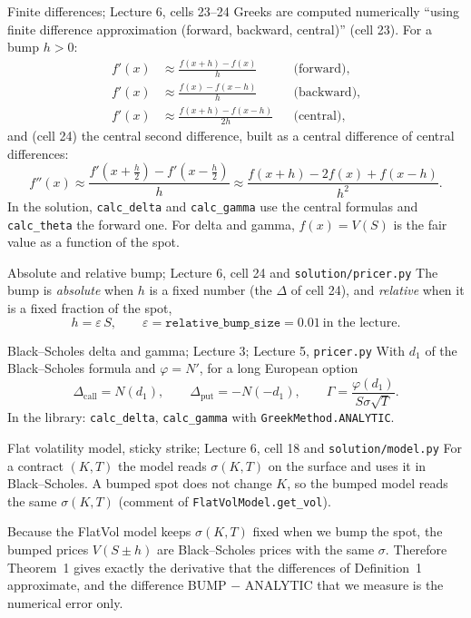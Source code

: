 \documentclass[11pt,a4paper]{article}
\begin{document}
\begin{defbox}{Finite differences; Lecture 6, cells 23--24}
Greeks are computed numerically ``using finite difference approximation (forward, backward, central)'' (cell 23). For a bump $h>0$:
\begin{equation}\label{eq:fd1}
\begin{aligned}
f'(x)&\approx\frac{f(x+h)-f(x)}{h} && \text{(forward)},\\
f'(x)&\approx\frac{f(x)-f(x-h)}{h} && \text{(backward)},\\
f'(x)&\approx\frac{f(x+h)-f(x-h)}{2h} && \text{(central)},
\end{aligned}
\end{equation}
and (cell 24) the central second difference, built as a central difference of central differences:
\begin{equation}\label{eq:fd2}
f''(x)\approx\frac{f'(x+\frac h2)-f'(x-\frac h2)}{h}\approx\frac{f(x+h)-2f(x)+f(x-h)}{h^2}.
\end{equation}
In the solution, \texttt{calc\_delta} and \texttt{calc\_gamma} use the central formulas and \texttt{calc\_theta} the forward one. For delta and gamma, $f(x)=V(S)$ is the fair value as a function of the spot.
\end{defbox}

\begin{defbox}{Absolute and relative bump; Lecture 6, cell 24 and \texttt{solution/pricer.py}}
The bump is \emph{absolute} when $h$ is a fixed number (the $\Delta$ of cell 24), and \emph{relative} when it is a fixed fraction of the spot,
\[
h=\varepsilon\,S,\qquad \varepsilon=\texttt{relative\_bump\_size}=0.01\ \text{in the lecture}.
\]
\end{defbox}

\begin{thmbox}{Black--Scholes delta and gamma; Lecture 3; Lecture 5, \texttt{pricer.py}}
With $d_1$ of the Black--Scholes formula and $\varphi=N'$, for a long European option
\begin{equation}\label{eq:bsgreeks}
\Delta_{\mathrm{call}}=N(d_1),\qquad \Delta_{\mathrm{put}}=-N(-d_1),\qquad \Gamma=\frac{\varphi(d_1)}{S\sigma\sqrt T}.
\end{equation}
In the library: \texttt{calc\_delta}, \texttt{calc\_gamma} with \texttt{GreekMethod.ANALYTIC}.
\end{thmbox}

\begin{defbox}{Flat volatility model, sticky strike; Lecture 6, cell 18 and \texttt{solution/model.py}}
For a contract $(K,T)$ the model reads $\sigma(K,T)$ on the surface and uses it in Black--Scholes. A bumped spot does not change $K$, so the bumped model reads the same $\sigma(K,T)$ (comment of \texttt{FlatVolModel.get\_vol}).
\end{defbox}
\noindent Because the FlatVol model keeps $\sigma(K,T)$ fixed when we bump the spot, the bumped prices $V(S\pm h)$ are Black--Scholes prices with the same $\sigma$. Therefore Theorem~1 gives exactly the derivative that the differences of Definition~1 approximate, and the difference BUMP $-$ ANALYTIC that we measure is the numerical error only.
\end{document}
